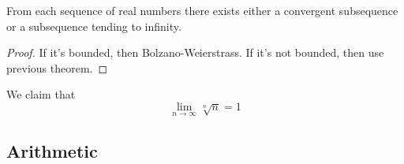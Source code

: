   \begin{corollary}
    \label{existence}
    From each sequence of real numbers there exists either a convergent subsequence or a subsequence tending to infinity. 
  \end{corollary}
  \begin{proof}
    If it's bounded, then Bolzano-Weierstrass. If it's not bounded, then use previous theorem. 
  \end{proof}

  \begin{example}
    We claim that
    \begin{equation}
      \lim_{n\rightarrow \infty} \sqrt[n]{n} = 1
    \end{equation}
  \end{example}

\subsection{Arithmetic}

